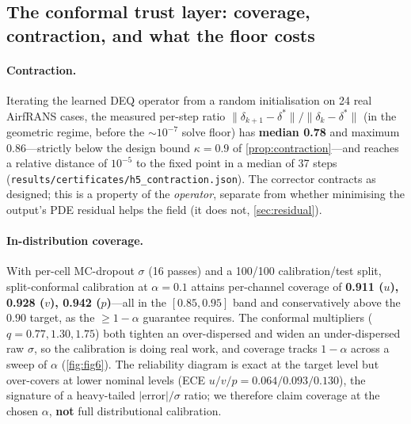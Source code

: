 
\subsection{The conformal trust layer: coverage, contraction, and what the floor costs}
\label{sec:conformal}

\paragraph{Contraction.} Iterating the learned DEQ operator from a random initialisation
on 24 real AirfRANS cases, the measured per-step ratio
$\|\delta_{k+1}-\delta^{*}\|/\|\delta_k-\delta^{*}\|$ (in the geometric regime, before the
$\sim 10^{-7}$ solve floor) has \textbf{median 0.78} and maximum $0.86$---strictly below
the design bound $\kappa = 0.9$ of \autoref{prop:contraction}---and reaches a relative
distance of $10^{-5}$ to the
fixed point in a median of 37 steps
(\texttt{results/certificates/h5\_contraction.json}). The corrector contracts as designed;
this is a property of the \emph{operator}, separate from whether minimising the output's
PDE residual helps the field (it does not, \autoref{sec:residual}).

\paragraph{In-distribution coverage.} With per-cell MC-dropout $\sigma$ (16 passes) and a
100/100 calibration/test split, split-conformal calibration at $\alpha = 0.1$ attains
per-channel coverage of \textbf{0.911 ($u$), 0.928 ($v$), 0.942 ($p$)}---all in the
$[0.85, 0.95]$ band and conservatively above the $0.90$ target, as the $\ge 1-\alpha$
guarantee requires. The conformal multipliers ($q = 0.77, 1.30, 1.75$) both tighten an
over-dispersed and widen an under-dispersed raw $\sigma$, so the calibration is doing real
work, and coverage tracks $1-\alpha$ across a sweep of $\alpha$ (\autoref{fig:fig6}). The
reliability diagram is exact at the target level but over-covers at lower nominal levels
(ECE $u/v/p = 0.064/0.093/0.130$), the signature of a heavy-tailed $|\text{error}|/\sigma$
ratio; we therefore claim coverage at the chosen $\alpha$, \textbf{not} full
distributional calibration.

